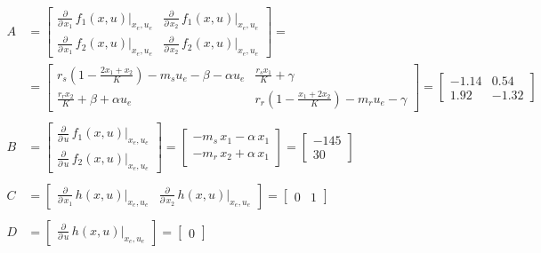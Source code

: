 \documentclass[a4paper, 11pt]{article}
\begin{document}
\begin{subequations}\label{eq:matrices}
\begin{align}
	A &= \begin{bmatrix}
		\frac{\partial}{\partial\,x_1}\,f_1(x,u)\bigg|_{x_e,u_e} & \frac{\partial}{\partial\,x_2}\,f_1(x,u)\bigg|_{x_e,u_e}
		\\
		\frac{\partial}{\partial\,x_1}\,f_2(x,u)\bigg|_{x_e,u_e} & \frac{\partial}{\partial\,x_2}\,f_2(x,u)\bigg|_{x_e,u_e}
	\end{bmatrix} 
	= 
	 \\ &= \begin{bmatrix}
r_s \left(1 - \frac{2x_1 + x_2}{K} \right) - m_s u_e - \beta - \alpha u_e  & \frac{r_s x_1}{K} + \gamma
		\\
\frac{r_r x_2}{K} + \beta + \alpha u_e & r_r \left( 1 - \frac{x_1+2x_2}{K} \right) - m_r u_e - \gamma
\end{bmatrix}
	=
	\begin{bmatrix}
		-1.14 & 0.54
		\\
		1.92 & -1.32
	\end{bmatrix}
	\\ \\ 
	B &= \begin{bmatrix}
		\frac{\partial}{\partial\,u}\,f_1(x,u)\bigg|_{x_e,u_e}
		\\
		\frac{\partial}{\partial\,u}\,f_2(x,u)\bigg|_{x_e,u_e}
	\end{bmatrix}
	=
	\begin{bmatrix}
		-m_s\,x_1-\alpha\,x_1
		\\
		-m_r\,x_2+\alpha\,x_1
	\end{bmatrix}
	=
	\begin{bmatrix}
		-145
		\\
		30
	\end{bmatrix}
	\\ \\
	C &= \begin{bmatrix}
		\frac{\partial}{\partial\,x_1}\,h(x,u)\bigg|_{x_e,u_e} & \frac{\partial}{\partial\,x_2}\,h(x,u)\bigg|_{x_e,u_e}
	\end{bmatrix}
	=\begin{bmatrix}
		0 & 1
	\end{bmatrix}
	\\ \\
	D &= \begin{bmatrix}
		\frac{\partial}{\partial\,u}\,h(x,u)\bigg|_{x_e,u_e}
	\end{bmatrix}
	= \begin{bmatrix}
	0
\end{bmatrix}
\end{align}
\end{subequations}
\end{document}
